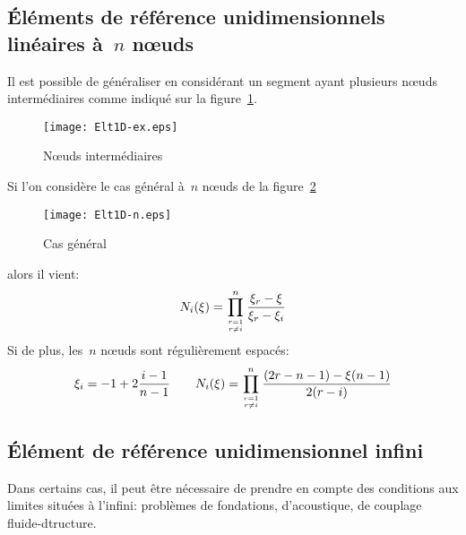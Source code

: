 \medskipvm
\subsection{Éléments de référence unidimensionnels linéaires à~$n$ nœuds}

Il est possible de généraliser en considérant un segment ayant plusieurs nœuds 
intermédiaires comme indiqué sur la figure~\ref{fig:ex2:noeudint}.
\begin{figure}[ht]\centering
\texttt{[image: Elt1D-ex.eps]}
\caption{Nœuds intermédiaires}\label{fig:ex2:noeudint}
\end{figure}
\medskipvm
Si l'on considère le cas général à~$n$ nœuds de la figure~\ref{fig:ex2:casgen}
\begin{figure}[ht]\centering
\texttt{[image: Elt1D-n.eps]}
\caption{Cas général}\label{fig:ex2:casgen}
\end{figure}
alors il vient:
\begin{equation} N_i(\xi) = \prod_{r=1\atop r\ne i}^n \dfrac{\xi_r-\xi}{\xi_r-\xi_i} \end{equation}
\medskipvm
Si de plus, les~$n$ nœuds sont régulièrement espacés:
\begin{equation}\xi_i = -1+2\frac{i-1}{n-1} \qquad
N_i(\xi) = \prod_{r=1\atop r\ne i}^n \dfrac{(2r-n-1)-\xi(n-1)}{2(r-i)} \end{equation}
\medskipvm
\subsection{Élément de référence unidimensionnel infini}

Dans certains cas, il peut être nécessaire de prendre en compte des conditions aux limites situées à
l'infini: problèmes de fondations, d'acoustique, de couplage fluide-dtructure.

